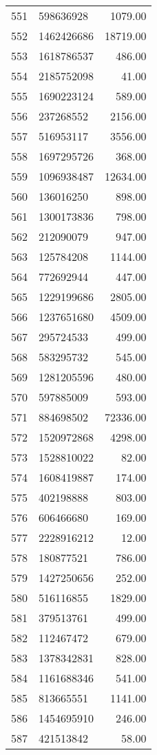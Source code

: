 \begin{table}[ht]
\begin{tabular}{rlr}
  551 & 598636928 & 1079.00 \\ 
  552 & 1462426686 & 18719.00 \\ 
  553 & 1618786537 & 486.00 \\ 
  554 & 2185752098 & 41.00 \\ 
  555 & 1690223124 & 589.00 \\ 
  556 & 237268552 & 2156.00 \\ 
  557 & 516953117 & 3556.00 \\ 
  558 & 1697295726 & 368.00 \\ 
  559 & 1096938487 & 12634.00 \\ 
  560 & 136016250 & 898.00 \\ 
  561 & 1300173836 & 798.00 \\ 
  562 & 212090079 & 947.00 \\ 
  563 & 125784208 & 1144.00 \\ 
  564 & 772692944 & 447.00 \\ 
  565 & 1229199686 & 2805.00 \\ 
  566 & 1237651680 & 4509.00 \\ 
  567 & 295724533 & 499.00 \\ 
  568 & 583295732 & 545.00 \\ 
  569 & 1281205596 & 480.00 \\ 
  570 & 597885009 & 593.00 \\ 
  571 & 884698502 & 72336.00 \\ 
  572 & 1520972868 & 4298.00 \\ 
  573 & 1528810022 & 82.00 \\ 
  574 & 1608419887 & 174.00 \\ 
  575 & 402198888 & 803.00 \\ 
  576 & 606466680 & 169.00 \\ 
  577 & 2228916212 & 12.00 \\ 
  578 & 180877521 & 786.00 \\ 
  579 & 1427250656 & 252.00 \\ 
  580 & 516116855 & 1829.00 \\ 
  581 & 379513761 & 499.00 \\ 
  582 & 112467472 & 679.00 \\ 
  583 & 1378342831 & 828.00 \\ 
  584 & 1161688346 & 541.00 \\ 
  585 & 813665551 & 1141.00 \\ 
  586 & 1454695910 & 246.00 \\ 
  587 & 421513842 & 58.00 \\ 

\end{tabular}
\end{table}
